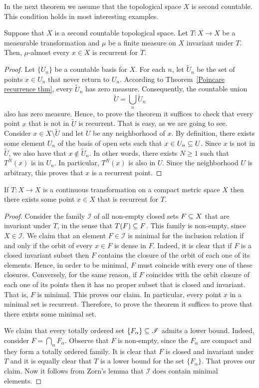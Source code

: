 In the next theorem we assume that the topological space $X$ is second countable. This condition holds in most interesting examples.
\begin{theorem}\label{Poincare recurrence topological}
Suppose that $X$ is a second countable topological space. Let $T:X\to X$ be a measurable transformation and $\mu$ be a finite measure on $X$ invariant under $T$. Then, $\mu$-almost every $x\in X$ is recurrent for $T$.
\end{theorem}
\begin{proof}
Let $\{U_n\}$ be a countable basis for $X$. For each $n$, let $\widetilde{U}_n$ be the set of points $x\in U_n$ that never return to $U_n$. According to Theorem~\ref{Poincare recurrence thm}, every $\widetilde{U}_n$ has zero measure. Consequently, the countable union
\[\widetilde{U}=\bigcup_n\widetilde{U}_n\]
also has zero measure. Hence, to prove the theorem it suffices to check that every point $x$ that is not in $\widetilde{U}$ is recurrent. That is easy, as we are going to see. Consider $x\in X\setminus\widetilde{U}$ and let $U$ be any neighborhood of $x$. By definition, there exists some element $U_n$ of the basis of open sets such that $x\in U_n\subseteq U$.
Since $x$ is not in $\widetilde{U}$, we also have that $x\notin\widetilde{U}_n$. In other words, there exists $N\geq 1$ such that $T^N(x)$ is in $U_n$. In particular, $T^N(x)$ is also in $U$. Since the neighborhood $U$ is arbitrary, this proves that $x$ is a recurrent point.
\end{proof}
\begin{theorem}
If $T:X\to X$ is a continuous transformation on a compact metric space $X$ then there exists some point $x\in X$ that is recurrent for $T$.
\end{theorem}
\begin{proof}
Consider the family $\mathscr{I}$ of all non-empty closed sets $F\subseteq X$ that are invariant under $T$, in the sense that $T(F)\subseteq F$. This family is non-empty, since $X\in\mathscr{I}$. We claim that an element $F\in\mathscr{I}$ is minimal for the inclusion relation if and only if the orbit of every $x\in F$ is dense in $F$. Indeed, it is clear that if $F$ is a closed invariant subset then $F$ contains the closure of the orbit of each one of its elements. Hence, in order to be minimal, $F$ must coincide with every one of these closures. Conversely, for the same reason, if $F$ coincides with the orbit closure of each one of its points then it has no proper subset that is closed and invariant. That is, $F$ is minimal. This proves our claim. In particular, every point $x$ in a minimal set is recurrent. Therefore, to prove the theorem it suffices to prove that there exists some minimal set.\par
We claim that every totally ordered set $\{F_\alpha\}\subseteq\mathscr{I}$ admits a lower bound. Indeed, consider $F=\bigcap_\alpha F_\alpha$. Observe that $F$ is non-empty, since the $F_\alpha$ are compact and they form a totally ordered family. It is clear that $F$ is closed and invariant under $T$ and it is equally clear that $T$ is a lower bound for the set $\{F_\alpha\}$. That proves our claim. Now it follows from Zorn's lemma that $\mathscr{I}$ does contain minimal elements.
\end{proof}
